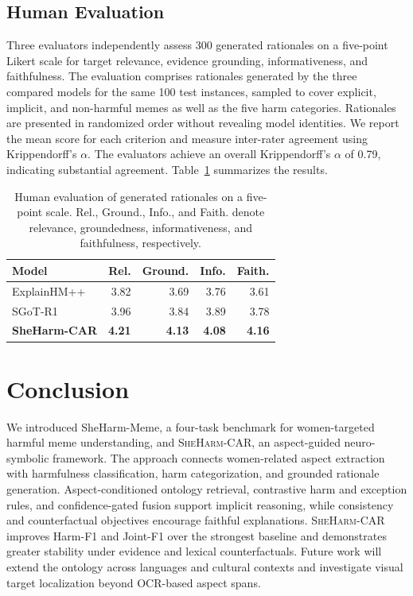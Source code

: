 \documentclass[11pt]{article}
\begin{document}
\subsection{Human Evaluation}
\label{subsec:human-evaluation}

Three evaluators independently assess 300 generated rationales on a
five-point Likert scale for target relevance, evidence grounding,
informativeness, and faithfulness. The evaluation comprises rationales
generated by the three compared models for the same 100 test instances,
sampled to cover explicit, implicit, and non-harmful memes as well as
the five harm categories. Rationales are presented in randomized order
without revealing model identities. We report the mean score for each
criterion and measure inter-rater agreement using Krippendorff's
$\alpha$. The evaluators achieve an
overall Krippendorff's $\alpha$ of 0.79, indicating substantial
agreement. Table~\ref{tab:human-evaluation} summarizes the results.

\begin{table}[t]
\centering
\small
\setlength{\tabcolsep}{4pt}
\renewcommand{\arraystretch}{1.04}
\begin{tabular}{lrrrr}
\toprule
\textbf{Model} &
\textbf{Rel.} &
\textbf{Ground.} &
\textbf{Info.} &
\textbf{Faith.} \\
\midrule
ExplainHM++
& 3.82 & 3.69 & 3.76 & 3.61 \\

SGoT-R1
& 3.96 & 3.84 & 3.89 & 3.78 \\

\textbf{SheHarm-CAR}
& \textbf{4.21}
& \textbf{4.13}
& \textbf{4.08}
& \textbf{4.16} \\
\bottomrule
\end{tabular}
\caption{Human evaluation of generated rationales on a five-point
scale. Rel., Ground., Info., and Faith. denote relevance,
groundedness, informativeness, and faithfulness, respectively.}
\label{tab:human-evaluation}
\end{table}

\section{Conclusion}

We introduced SheHarm-Meme, a four-task benchmark for women-targeted
harmful meme understanding, and \textsc{SheHarm-CAR}, an
aspect-guided neuro-symbolic framework. The approach connects
women-related aspect extraction with harmfulness classification, harm
categorization, and grounded rationale generation. Aspect-conditioned
ontology retrieval, contrastive harm and exception rules, and
confidence-gated fusion support implicit reasoning, while consistency
and counterfactual objectives encourage faithful explanations.
\textsc{SheHarm-CAR} improves Harm-F1 and Joint-F1 over the strongest
baseline and demonstrates greater stability under evidence and lexical
counterfactuals. Future work will extend the ontology across
languages and cultural contexts and investigate visual target
localization beyond OCR-based aspect spans.
\end{document}
